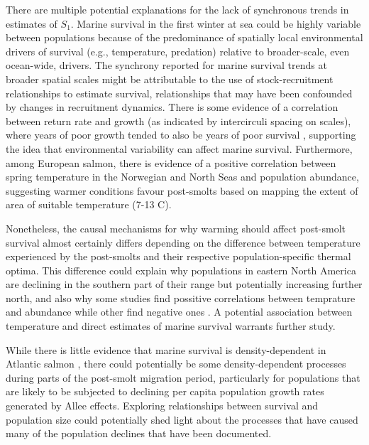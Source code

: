 \documentclass[12pt]{article}
\newcommand{\So}{$S_{1}$\xspace}
\begin{document}
There are multiple potential explanations for the lack of synchronous
trends in estimates of \So. 
Marine survival in the first winter at sea could be highly variable between
populations because of the predominance of spatially local environmental drivers of survival (e.g., temperature, predation) 
relative to broader-scale, even ocean-wide, drivers.
The synchrony reported for marine survival trends at broader spatial scales \citep{Olmos2019}
might be attributable to the use of stock-recruitment relationships to estimate survival,
relationships that may have been confounded by changes in recruitment dynamics.
There is some evidence of a correlation between return rate and growth (as
indicated by intercirculi spacing on scales), where years of poor growth
tended to also be years of poor survival \citep{Friedland1993}, supporting the
idea that environmental variability can affect marine survival.
Furthermore, among European salmon, there is evidence of a positive correlation
between spring temperature in the Norwegian and North Seas and population abundance, suggesting warmer
conditions favour post-smolts \citep{Friedland1998} based on mapping the
extent of area of suitable temperature (7-13 \textdegree C).

Nonetheless, the causal mechanisms for why warming should affect post-smolt
survival almost certainly differs depending on the difference between
temperature experienced by the post-smolts and their respective
population-specific thermal optima. 
This difference could explain why populations in eastern North America are
declining in the southern part of their range but potentially increasing
further north, and also why some studies find possitive correlations between
temprature and abundance \citep{Friedland1998, Friedland1998b, Jonsson2004}
while other find negative ones \citep{Friedland1993, Todd2008}.
A potential association between temperature and direct estimates of marine
survival warrants further study.

While there is little evidence that marine survival is density-dependent in
Atlantic salmon \citep{Jonsson1998,Gibson2006}, there could potentially be
some density-dependent processes during parts of the post-smolt migration
period, particularly for populations that are likely to be subjected to
declining per capita population growth rates generated by Allee effects.
Exploring relationships between survival and population size could potentially
shed light about the processes that have caused many of the population
declines that have been documented.
\end{document}
